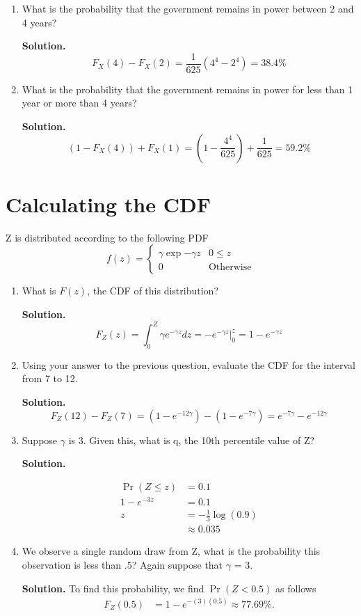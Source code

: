 \documentclass[12pt]{article}
\begin{document}
\begin{enumerate}
    \item What is the probability that the government remains in power between 2 and 4 years?
    
    \textbf{Solution.}
    \[ F_X(4) - F_X(2) = \frac{1}{625}(4^4 - 2^4) = 38.4\% \]

    \item What is the probability that the government remains in power for less than 1 year or more than 4 years?

    \textbf{Solution.}
    \[ (1- F_X(4)) + F_X(1) = (1-\frac{4^4}{625}) + \frac{1}{625} = 59.2\%\]
\end{enumerate}


\section{Calculating the CDF}
Z is distributed according to the following PDF
\[f(z) = \begin{cases}
    \gamma \exp{-\gamma z} & 0 \leq z
    \\ 0 & \text{Otherwise}
\end{cases}\]

\begin{enumerate}
    \item  What is $F(z)$, the CDF of this distribution?
    
    \textbf{Solution.}
    \[ F_Z(z) = \int_0^Z \gamma e^{-\gamma z} dz = -e^{- \gamma z} \bigg|_0^z = 1-e^{- \gamma z}\]

    \item  Using your answer to the previous question, evaluate the CDF for the interval from 7 to 12.

    \textbf{Solution.}
    \[ F_Z(12)-F_Z(7) = \left( 1- e^{-12\gamma}\right) - \left( 1- e^{-7\gamma}\right) =  e^{-7\gamma}- e^{-12\gamma}\]

    \item  Suppose $\gamma$ is 3. Given this, what is q, the 10th percentile value of Z?

    \textbf{Solution.}

    \begin{align*}
        \Pr(Z \leq z) &= 0.1
        \\ 1-e^{- 3 z} &= 0.1
        \\ z &= -\frac{1}{3}\log(0.9)
        \\ &\approx 0.035
    \end{align*}

    \item  We observe a single random draw from Z, what is the probability this observation is less than .5? Again suppose that $\gamma$ = 3.

    \textbf{Solution.} To find this probability, we find $\Pr(Z < 0.5)$ as follows
    \begin{align*}
        F_Z(0.5) &= 1-e^{- (3) (0.5)} \approx 77.69\%.
    \end{align*}
\end{enumerate}
\end{document}

